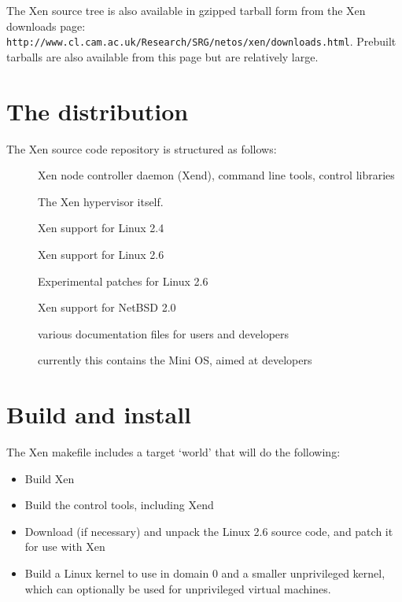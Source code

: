 \documentclass[11pt,twoside,final,openright]{xenstyle}
\begin{document}
The Xen source tree is also available in gzipped tarball form from the
Xen downloads page:\\
{\tt http://www.cl.cam.ac.uk/Research/SRG/netos/xen/downloads.html}.
Prebuilt tarballs are also available from this page but are relatively
 large.

\section{The distribution}

The Xen source code repository is structured as follows:

\begin{description}
\item[] Xen node controller daemon (Xend), command line tools, 
  control libraries
\item[] The Xen hypervisor itself.
\item[] Xen support for Linux 2.4
\item[] Xen support for Linux 2.6
\item[] Experimental patches for Linux 2.6
\item[] Xen support for NetBSD 2.0
\item[] various documentation files for users and developers
\item[] currently this contains the Mini OS, aimed at developers
\end{description}

\section{Build and install}

The Xen makefile includes a target `world' that will do the
following:

\begin{itemize}
\item Build Xen
\item Build the control tools, including Xend
\item Download (if necessary) and unpack the Linux 2.6 source code,
      and patch it for use with Xen
\item Build a Linux kernel to use in domain 0 and a smaller
      unprivileged kernel, which can optionally be used for
      unprivileged virtual machines.
\end{itemize}
\end{document}
